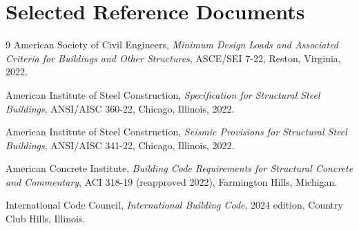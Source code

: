 \section{Selected Reference Documents}

\begin{thebibliography}{9}
American Society of Civil Engineers,
\emph{Minimum Design Loads and Associated Criteria for Buildings and Other
Structures}, ASCE/SEI 7-22, Reston, Virginia, 2022.

American Institute of Steel Construction,
\emph{Specification for Structural Steel Buildings}, ANSI/AISC 360-22,
Chicago, Illinois, 2022.

American Institute of Steel Construction,
\emph{Seismic Provisions for Structural Steel Buildings}, ANSI/AISC 341-22,
Chicago, Illinois, 2022.

American Concrete Institute,
\emph{Building Code Requirements for Structural Concrete and Commentary},
ACI 318-19 (reapproved 2022), Farmington Hills, Michigan.

International Code Council,
\emph{International Building Code}, 2024 edition, Country Club Hills, Illinois.
\end{thebibliography}

\clearpage
